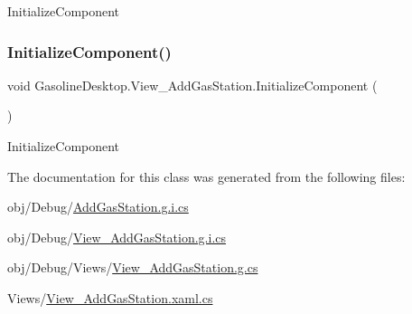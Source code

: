 Initialize\+Component 

\mbox{\label{class_gasoline_desktop_1_1_view___add_gas_station_ac4b16228281e3a2095d38884963fd93f}} 
\subsubsection{\texorpdfstring{InitializeComponent()}{InitializeComponent()}\hspace{0.1cm}{\footnotesize\ttfamily [4/4]}}
{\footnotesize\ttfamily void Gasoline\+Desktop.\+View\+\_\+\+Add\+Gas\+Station.\+Initialize\+Component (\begin{DoxyParamCaption}{ }\end{DoxyParamCaption})}



Initialize\+Component 



The documentation for this class was generated from the following files\+:\begin{DoxyCompactItemize}
\item 
obj/\+Debug/\mbox{\hyperlink{_add_gas_station_8g_8i_8cs}{Add\+Gas\+Station.\+g.\+i.\+cs}}\item 
obj/\+Debug/\mbox{\hyperlink{_view___add_gas_station_8g_8i_8cs}{View\+\_\+\+Add\+Gas\+Station.\+g.\+i.\+cs}}\item 
obj/\+Debug/\+Views/\mbox{\hyperlink{_view___add_gas_station_8g_8cs}{View\+\_\+\+Add\+Gas\+Station.\+g.\+cs}}\item 
Views/\mbox{\hyperlink{_view___add_gas_station_8xaml_8cs}{View\+\_\+\+Add\+Gas\+Station.\+xaml.\+cs}}\end{DoxyCompactItemize}
